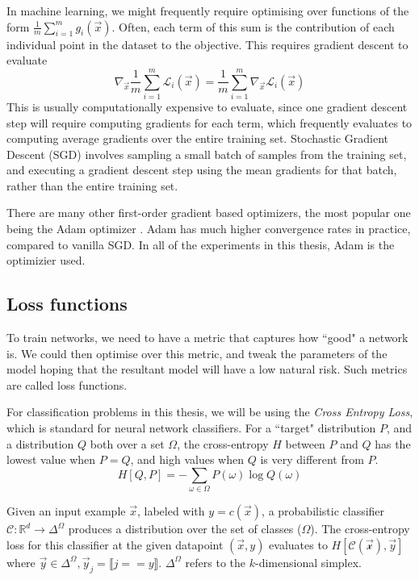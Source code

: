 \documentclass{ociamthesis}
\begin{document}
In machine learning, we might frequently require optimising over functions of
the form $\frac{1}{m}\sum_{i=1}^m g_i(\vec{x})$. Often, each term of this sum is
the contribution of each individual point in the dataset to the objective. This
requires gradient descent to evaluate
\begin{equation*}
    \nabla_\vec{x} \frac{1}{m}\sum_{i=1}^m \mathcal{L}_i(\vec{x})
    = \frac{1}{m} \sum_{i=1}^m \nabla_\vec{x} \mathcal{L}_i(\vec{x})
\end{equation*}
This is usually computationally expensive to evaluate, since one gradient
descent step will require computing gradients for each term, which frequently
evaluates to computing average gradients over the entire training set.
Stochastic Gradient Descent (SGD) involves sampling a small batch of samples
from the training set, and executing a gradient descent step using the mean
gradients for that batch, rather than the entire training set.

There are many other first-order gradient based optimizers, the most popular one
being the Adam optimizer \citep{Adam}. Adam has much higher convergence rates in
practice, compared to vanilla SGD. In all of the experiments in this thesis,
Adam is the optimizier used. %

\subsection{Loss functions}
To train networks, we need to have a metric that captures how ``good" a network
is. We could then optimise over this metric, and tweak the parameters of the
model hoping that the resultant model will have a low natural risk. Such metrics
are called loss functions.

For classification problems in this thesis, we will be using the \emph{Cross
Entropy Loss}, which is standard for neural network classifiers. For a ``target"
distribution $P$, and a distribution $Q$ both over a set $\Omega$, the
cross-entropy $H$ between $P$ and $Q$ has the lowest value when $P=Q$, and high
values when $Q$ is very different from $P$.
\begin{equation*}
    H[Q, P] = -\sum_{\omega \in \Omega} P(\omega) \log Q(\omega)
\end{equation*}

Given an input example $\vec{x}$, labeled with $y=c(\vec{x})$, a probabilistic
classifier $\mathcal{C}: \mathbb{R}^d \to \Delta^\Omega$ produces a distribution
over the set of classes ($\Omega$). The cross-entropy loss for this classifier
at the given datapoint $(\vec{x}, y)$ evaluates to
$H[\mathcal{C(\mathcal{\vec{x}})}, \vec{y}]$ where $\vec{y} \in \Delta^\Omega,
\vec{y}_j=\llbracket j == y \rrbracket$. $\Delta^\Omega$ refers to the
$k$-dimensional simplex.
\end{document}
